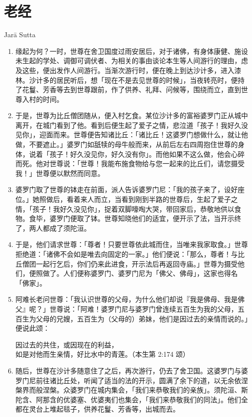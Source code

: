 \section{老经}

\begin{center}Jarā Sutta\end{center}\vspace{1em}

\begin{enumerate}\item 缘起为何？一时，世尊在舍卫国度过雨安居后，对于诸佛，有身体康健、施设未生起的学处、调御可调伏者、为相关的事由谈论本生等人间游行的理由，虑及这些，便出发作人间游行。当渐次游行时，便在晚上到达沙计多，进入漆林。沙计多的居民听后，想「现在不是去见世尊的时候」，当夜转亮时，便持了花鬘、芳香等去到世尊跟前，作了供养、礼拜、问候等，围绕而立，直到世尊入村的时间。
\item 于是，世尊为比丘僧团随从，便入村乞食。某位沙计多的富裕婆罗门正从城中离开，在城门看到了他。看到后便生起了爱子之情，悲泣道「孩子！我好久没见你」，迎面而来。世尊便告知诸比丘：「诸比丘！这婆罗门想做什么，就让他做，不要遮止。」婆罗门如舐犊的母牛般而来，从前后左右四周抱住世尊的身体，说着「孩子！好久没见你，好久没有你」。而他如果不这么做，他会心碎而死。他对世尊说：「世尊！我能布施食物给与您一起来的比丘们，请您摄受我！」世尊便以默然而同意。
\item 婆罗门取了世尊的钵走在前面，派人告诉婆罗门尼：「我的孩子来了，设好座位。」她照做后，看着来人而立，当看到刚到半路的世尊后，生起了爱子之情，「孩子！我好久没见你」，捉着双脚嚎啕大哭，带回家后，恭敬地供以食物。食毕，婆罗门便取了钵。世尊知晓他们的适宜，便开示了法，当开示终了，两人都成了须陀洹。
\item 于是，他们请求世尊：「尊者！只要世尊依此城而住，当唯来我家取食。」世尊拒绝道：「诸佛不会如是唯去向固定的一家。」他们便说：「那么，尊者！与比丘僧团一起行乞后，你们仍来此进食，开示法后再返回寺庙。」世尊为摄受他们，便照做了。人们便称婆罗门、婆罗门尼为「佛父、佛母」，这家也得名「佛家」。
\item 阿难长老问世尊：「我认识世尊的父母，为什么他们却说『我是佛母、我是佛父』呢？」世尊说：「阿难！婆罗门尼与婆罗门曾连续五百生为我的父母，五百生为父母的兄嫂，五百生为（父母的）弟妹，他们是因过去的亲情而说的。」便说此颂：\begin{quoting}因过去的共住，或因现在的利益，\\如是对他而生亲情，好比水中的青莲。（本生第 2:174 颂）\end{quoting}
\item 随后，世尊在沙计多随意住了之后，再次游行，仍去了舍卫国。这婆罗门与婆罗门尼前往诸比丘处，听闻了适当的法的开示，圆满了余下的道，以无余依涅槃界而般涅槃。众婆罗门在城内集会，「我们来恭敬我们的亲族」。须陀洹、斯陀含、阿那含的优婆塞、优婆夷们也集会，「我们来恭敬我们的同法」。他们全都在灵台上堆起毯子，供养花鬘、芳香等，出城而去。

\end{enumerate}
